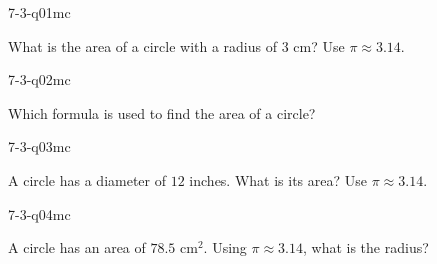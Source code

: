 

\begin{practiceQuestion}{7-3-q01}{mc}
\begin{questionText}
What is the area of a circle with a radius of $3$ cm? Use $\pi \approx 3.14$.
\end{questionText}
\end{practiceQuestion}

\begin{practiceQuestion}{7-3-q02}{mc}
\begin{questionText}
Which formula is used to find the area of a circle?
\end{questionText}
\end{practiceQuestion}

\begin{practiceQuestion}{7-3-q03}{mc}
\begin{questionText}
A circle has a diameter of $12$ inches. What is its area? Use $\pi \approx 3.14$.
\end{questionText}
\end{practiceQuestion}

\begin{practiceQuestion}{7-3-q04}{mc}
\begin{questionText}
A circle has an area of $78.5$ cm$^2$. Using $\pi \approx 3.14$, what is the radius?
\end{questionText}
\end{practiceQuestion}

